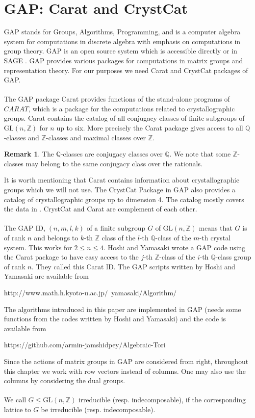 \documentclass[12pt]{article}
\theoremstyle{plain}
\theoremstyle{definition}
\newtheorem*{remark}{Remark}
\newcommand{\Z}{\ensuremath{\mathbb{Z}}}
\newcommand{\Q}{\ensuremath{\mathbb{Q}}}
\newcommand{\G}{G}
\begin{document}
\section{GAP: Carat and CrystCat}\label{sec:gap}
GAP \cite{GAP4} stands for Groups, Algorithms, Programming, and is a computer 
algebra system for computations in discrete algebra with emphasis on computations 
in group theory. GAP is an open source system which is accessible directly or 
in SAGE \cite{sagemath}. GAP provides various packages for computations in matrix 
groups and representation theory. For our purposes we need Carat and CrystCat packages of GAP.\\
\\
The GAP package Carat provides functions of the stand-alone programs of $CARAT$, 
which is a package for the computations related to crystallographic groups. Carat 
contains the catalog of all conjugacy classes of finite subgroups of $\mathrm{GL}(n,\Z)$ 
for $n$ up to six. More precisely the Carat package gives access to all 
$\Q$-classes and $\Z$-classes and maximal classes over $\Z$.  
\begin{remark}
The $\Q$-classes are conjugacy classes over $\Q$. We note that some $\Z$-classes 
may belong to the same conjugacy class over the rationals.
\end{remark}

It is worth mentioning that Carat contains information about crystallographic groups 
which we will not use. The CrystCat Package in GAP also provides a catalog of 
crystallographic groups up to dimension 4. The catalog mostly covers the data in 
\cite{Crystallography}. CrystCat and Carat are complement of each other. \\
\\
The GAP ID, $(n,m,l,k)$ of a finite subgroup $G$ of $\mathrm{GL}(n,\Z)$ means that 
$G$ is of rank $n$ and belongs to $k$-th $\Z$ class of the $l$-th $\Q$-class of the 
$m$-th crystal system. This works for $2\leq n \leq 4$. Hoshi and Yamasaki wrote 
a GAP code using the Carat package to have easy access to the $j$-th $\Z$-class 
of the $i$-th $\Q$-class group of rank $n$. They called this Carat ID. The GAP 
scripts written by Hoshi and Yamasaki are available from
\begin{center}
http://www.math.h.kyoto-u.ac.jp/~yamasaki/Algorithm/
\end{center}
The algorithms introduced in this paper are implemented in GAP (needs some 
functions from the codes written by Hoshi and Yamasaki) and the code is available from
\begin{center}
https://github.com/armin-jamshidpey/Algebraic-Tori
\end{center}
Since the actions of matrix groups in GAP are considered from right, throughout 
this chapter we work with row vectors instead of columns. One may also use the 
columns by considering the dual groups.\\
\\
We call $\G \leq \mathrm{GL}(n,\Z)$ irreducible (resp. indecomposable), if the corresponding 
lattice to $G$ be irreducible (resp. indecomposable).
\end{document}
